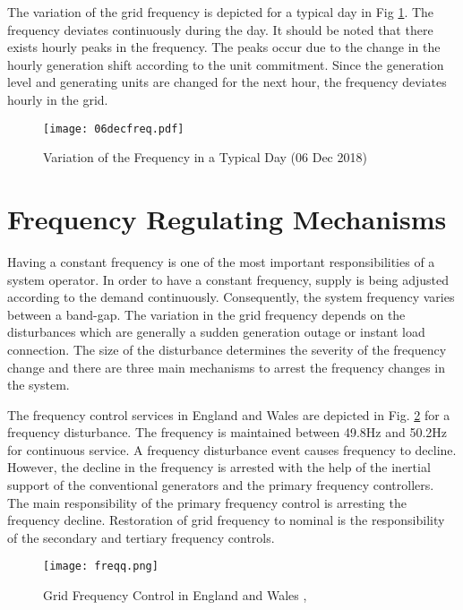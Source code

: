 The variation of the grid frequency is depicted for a typical day in Fig \ref{06decfreq}. The frequency deviates continuously during the day. It should be noted that there exists hourly peaks in the frequency. The peaks occur due to the change in the hourly generation shift according to the unit commitment. Since the generation level and generating units are changed for the next hour, the frequency deviates hourly in the grid.
\begin{figure}[h!]
	\centering
	\texttt{[image: 06decfreq.pdf]}
	\caption{Variation of the Frequency in a Typical Day (06 Dec 2018) \cite{teiasfreq}}
	\label{06decfreq}
\end{figure}
\section{Frequency Regulating Mechanisms}
Having a constant frequency is one of the most important responsibilities of a system operator. In order to have a constant frequency, supply is being adjusted according to the demand continuously. Consequently, the system frequency varies between a band-gap. The variation in the grid frequency depends on the disturbances which are generally a sudden generation outage or instant load connection. The size of the disturbance determines the severity of the frequency change and there are three main mechanisms to arrest the frequency changes in the system. \par
The frequency control services in England and Wales are depicted in Fig. \ref{freqcontrol} for a frequency disturbance. The frequency is maintained between 49.8Hz and 50.2Hz for continuous service. A frequency disturbance event causes frequency to decline. However, the decline in the frequency is arrested with the help of the inertial support of the conventional generators and the primary frequency controllers. The main responsibility of the primary frequency control is arresting the frequency decline. Restoration of grid frequency to nominal is the responsibility of the secondary and tertiary frequency controls.
\begin{figure}[h!]
	\centering
	\texttt{[image: freqq.png]}
	\caption{Grid Frequency Control in England and Wales \cite{Ekanayake2008}, \cite{Erinmez1999}}
	\label{freqcontrol}
\end{figure}
